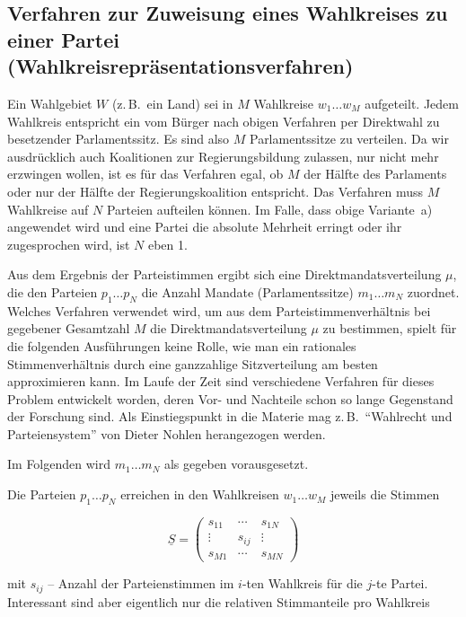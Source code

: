 \subsection{Verfahren zur Zuweisung eines Wahlkreises zu einer Partei
  (Wahlkreisrepräsentationsverfahren)}

Ein Wahlgebiet $W$ (z.\,B.\ ein Land) sei in $M$ Wahlkreise $w_1 \ldots w_M$ aufgeteilt. Jedem
Wahlkreis entspricht ein vom Bürger nach obigen Verfahren per Direktwahl zu besetzender
Parlamentssitz. Es sind also $M$ Parlamentssitze zu verteilen. Da wir ausdrücklich auch
Koalitionen zur Regierungsbildung zulassen, nur nicht mehr erzwingen wollen, ist es für das
Verfahren egal, ob $M$ der Hälfte des Parlaments oder nur der Hälfte der Regierungskoalition
entspricht. Das Verfahren muss $M$ Wahlkreise auf $N$ Parteien aufteilen können. Im Falle, dass
obige Variante~a) angewendet wird und eine Partei die absolute Mehrheit erringt oder ihr
zugesprochen wird, ist $N$ eben 1.

Aus dem Ergebnis der Parteistimmen ergibt sich eine Direktmandatsverteilung $\mu$, die den
Parteien $p_1 \ldots p_N$ die Anzahl Mandate (Parlamentssitze) $m_1 \ldots m_N$ zuordnet.
Welches Verfahren verwendet wird, um aus dem Parteistimmenverhältnis bei gegebener Gesamtzahl $M$
die Direktmandatsverteilung $\mu$ zu bestimmen, spielt für die folgenden Ausführungen keine Rolle,
wie man ein rationales Stimmenverhältnis durch eine ganzzahlige Sitzverteilung am besten
approximieren kann. Im Laufe der Zeit sind verschiedene Verfahren für dieses Problem entwickelt
worden, deren Vor- und Nachteile schon so lange Gegenstand der Forschung sind. Als Einstiegspunkt
in die Materie mag z.\,B.\ \enquote{Wahlrecht und Parteiensystem} von Dieter Nohlen herangezogen
werden.

Im Folgenden wird $m_1 \ldots m_N$ als gegeben vorausgesetzt.

Die Parteien $p_1 \ldots p_N$ erreichen in den Wahlkreisen $w_1 \ldots w_M$ jeweils die Stimmen

\[
  \underline{S} = \begin{pmatrix}
    s_{11} & \cdots & s_{1N} \\
    \vdots & s_{ij} & \vdots \\
    s_{M1} & \cdots & s_{MN}
  \end{pmatrix}
\]

mit $s_{ij}$ -- Anzahl der Parteienstimmen im $i$-ten Wahlkreis für die $j$-te Partei.
Interessant sind aber eigentlich nur die relativen Stimmanteile pro Wahlkreis

